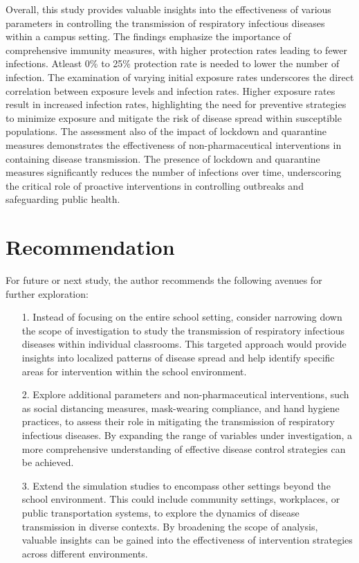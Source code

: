Overall,  this study provides valuable insights into the effectiveness of various parameters in controlling the transmission of respiratory infectious diseases within a campus setting. The findings emphasize the importance of comprehensive immunity measures, with higher protection rates leading to fewer infections. Atleast 0\% to 25\% protection rate is needed to lower the number of infection. The examination of varying initial exposure rates underscores the direct correlation between exposure levels and infection rates. Higher exposure rates result in increased infection rates, highlighting the need for preventive strategies to minimize exposure and mitigate the risk of disease spread within susceptible populations. The assessment also of the impact of lockdown and quarantine measures demonstrates the effectiveness of non-pharmaceutical interventions in containing disease transmission. The presence of lockdown and quarantine measures significantly reduces the number of infections over time, underscoring the critical role of proactive interventions in controlling outbreaks and safeguarding public health.






\section{Recommendation}
\indent \indent For future or next study, the author recommends the following avenues for further exploration:
\begin{itemize}
	\item[1.] Instead of focusing on the entire school setting, consider narrowing down the scope of investigation to study the transmission of respiratory infectious diseases within individual classrooms. This targeted approach would provide insights into localized patterns of disease spread and help identify specific areas for intervention within the school environment.
	
	\item[2.] Explore additional parameters and non-pharmaceutical interventions, such as social distancing measures, mask-wearing compliance, and hand hygiene practices, to assess their role in mitigating the transmission of respiratory infectious diseases. By expanding the range of variables under investigation, a more comprehensive understanding of effective disease control strategies can be achieved.
	
	\item[3.] Extend the simulation studies to encompass other settings beyond the school environment. This could include community settings, workplaces, or public transportation systems, to explore the dynamics of disease transmission in diverse contexts. By broadening the scope of analysis, valuable insights can be gained into the effectiveness of intervention strategies across different environments.
\end{itemize}



 

